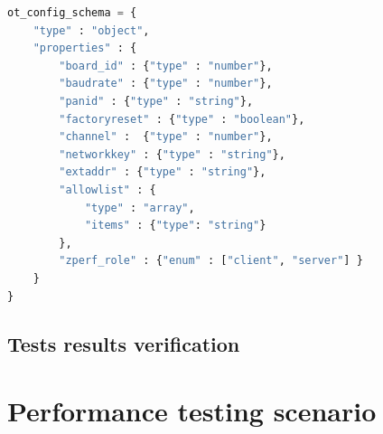 \medskip
\begin{lstlisting}[language=Python, label={lst:json-schema}, caption={The json 
schema used to parse boards configuration files.}]
ot_config_schema = {
    "type" : "object",
    "properties" : {
        "board_id" : {"type" : "number"},
        "baudrate" : {"type" : "number"},
        "panid" : {"type" : "string"},
        "factoryreset" : {"type" : "boolean"},
        "channel" :  {"type" : "number"},
        "networkkey" : {"type" : "string"},
        "extaddr" : {"type" : "string"},
        "allowlist" : {
            "type" : "array",
            "items" : {"type": "string"}
        },
        "zperf_role" : {"enum" : ["client", "server"] }
    }
}
\end{lstlisting}

\subsection{Tests results verification}
\label{sec:test-results-verification}



\medskip
\section{Performance testing scenario}
\label{sec:performance-testing-scenario}
